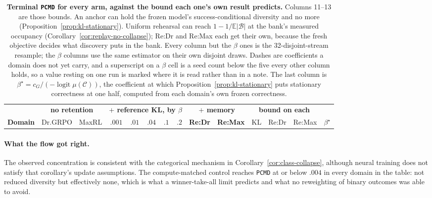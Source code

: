 \documentclass{article}
\newcommand{\1}{\mathbf 1}
\newcommand{\E}{\mathbb E}
\newcommand{\pmd}{\texttt{PCMD}}
\theoremstyle{remark}
\theoremstyle{definition}
\theoremstyle{plain}
\begin{document}
\begin{table}[t]
  \centering
  \caption{\textbf{Terminal \pmd{} for every arm, against the bound each one's
  own result predicts.} Columns 11--13 are those bounds. An anchor can
  hold the frozen model's success-conditional diversity and no more
  (Proposition~\ref{prop:kl-stationary}). Uniform rehearsal can reach
  $1-1/\E|\mathcal B|$ at the bank's measured occupancy
  (Corollary~\ref{cor:replay-no-collapse}); Re:Dr and Re:Max each get their own,
  because the fresh objective decides what discovery puts in the bank. Every
  column but the $\beta$ ones is the 32-disjoint-stream resample; the $\beta$
  columns use the same estimator on their own disjoint draws. Dashes are
  coefficients a domain does not yet carry, and a superscript on a $\beta$ cell
  is a seed count below the five every other column holds, so a value resting
  on one run is marked where it is read rather than in a note. The last column
  is $\beta^\star=c_G/(-\operatorname{logit}\mu(\mathcal C))$, the coefficient
  at which Proposition~\ref{prop:kl-stationary} puts stationary correctness at
  one half, computed from each domain's own frozen correctness.}
  \label{tab:reference-kl-measured}
  \scriptsize
  \setlength{\tabcolsep}{2.9pt}
  \begin{tabular}{@{}lrrrrrrrrrrrrr@{}}
    \toprule
    & \multicolumn{2}{c}{\textbf{no retention}}
      & \multicolumn{5}{c}{\textbf{$+$ reference KL, by $\beta$}}
      & \multicolumn{2}{c}{\textbf{$+$ memory}}
      & \multicolumn{3}{c}{\textbf{bound on each}} & \\
    \cmidrule(lr){2-3}\cmidrule(lr){4-8}\cmidrule(lr){9-10}\cmidrule(lr){11-13}
    \textbf{Domain} & Dr.GRPO & MaxRL
      & $.001$ & $.01$ & $.04$ & $.1$ & $.2$
      & \textbf{Re:Dr} & \textbf{Re:Max}
      & KL & Re:Dr & Re:Max & $\beta^\star$ \\
    \midrule
    
  \end{tabular}
\end{table}
\paragraph{What the flow got right.}
The observed concentration is consistent with the categorical mechanism
in Corollary~\ref{cor:class-collapse}, although neural training does not
satisfy that corollary's update assumptions. The
compute-matched control reaches \pmd{} at or below $.004$ in every domain in
the table: not reduced diversity but effectively none, which is what a
winner-take-all limit predicts and what no reweighting of binary outcomes was
able to avoid.
\end{document}
